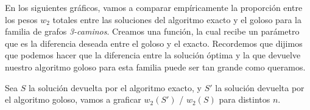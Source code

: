 \vspace{1cm}

En los siguientes gráficos, vamos a comparar empíricamente la proporción entre los pesos $w_2$ totales entre las soluciones del algoritmo exacto y el goloso para la familia de grafos \emph{3-caminos}. Creamos una función, la cual recibe un parámetro que es la diferencia deseada entre el goloso y el exacto. Recordemos que dijimos que podemos hacer que la diferencia entre la solución óptima y la que devuelve nuestro algoritmo goloso para esta familia puede ser tan grande como queramos.

Sea $S$ la solución devuelta por el algoritmo exacto, y $S'$ la solución devuelta por el algoritmo goloso, vamos a graficar $w_2(S')$ / $w_2(S)$ para distintos $n$.


